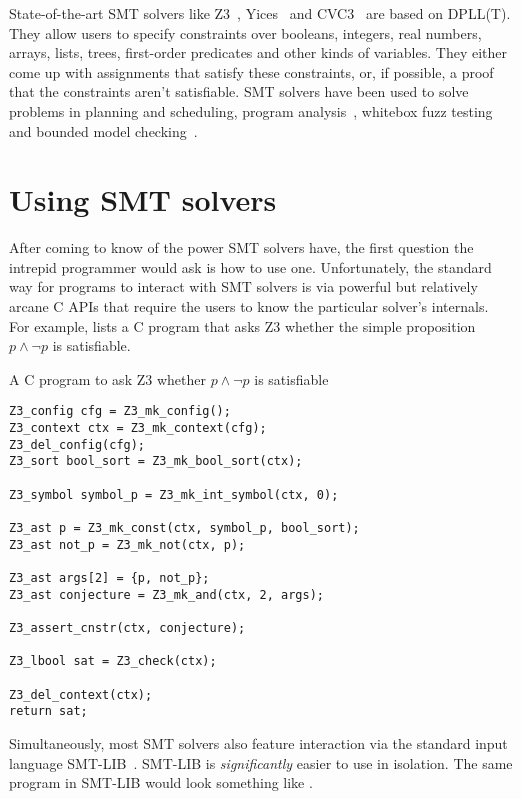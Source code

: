 State-of-the-art SMT solvers like Z3~\cite{z3}, Yices~\cite{yices} and
CVC3~\cite{cvc3} are based on DPLL(T). They allow users to specify constraints
over booleans, integers, real numbers, arrays, lists, trees, first-order
predicates and other kinds of variables. They either come up with assignments
that satisfy these constraints, or, if possible, a proof that the constraints
aren't satisfiable. SMT solvers have been used to solve problems in planning
and scheduling, program analysis~\cite{Gulwani:08}, whitebox fuzz
testing~\cite{Godefroid:08} and bounded model checking~\cite{Armando:09}.

\section{Using SMT solvers}
\label{sec:usingsmt}

After coming to know of the power SMT solvers have, the first question the
intrepid programmer would ask is how to use one. Unfortunately, the standard
way for programs to interact with SMT solvers is via powerful but relatively
arcane C APIs that require the users to know the particular solver's
internals. For example,  lists a C program that asks Z3
whether the simple proposition $p \wedge \neg p$ is satisfiable.

\begin{program}
\caption{A C program to ask Z3 whether $p \wedge \neg p$ is satisfiable}
\label{fig:c-prop}
\begin{verbatim}
Z3_config cfg = Z3_mk_config();
Z3_context ctx = Z3_mk_context(cfg);
Z3_del_config(cfg);
Z3_sort bool_sort = Z3_mk_bool_sort(ctx);

Z3_symbol symbol_p = Z3_mk_int_symbol(ctx, 0);

Z3_ast p = Z3_mk_const(ctx, symbol_p, bool_sort);
Z3_ast not_p = Z3_mk_not(ctx, p);

Z3_ast args[2] = {p, not_p};
Z3_ast conjecture = Z3_mk_and(ctx, 2, args);

Z3_assert_cnstr(ctx, conjecture);

Z3_lbool sat = Z3_check(ctx);

Z3_del_context(ctx);
return sat;
\end{verbatim}
\end{program}

Simultaneously, most SMT solvers also feature interaction via the standard
input language SMT-LIB~\cite{smtlib2:10}. SMT-LIB is \textit{significantly}
easier to use in isolation. The same program in SMT-LIB would look something
like .

